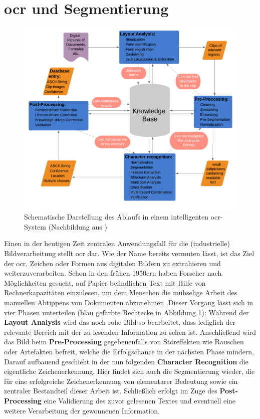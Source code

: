 	\section{\gls{ocr} und Segmentierung}
	\label{sec:ocr-seg}
		\begin{figure}[H]
			\centering
			\includegraphics[width=\linewidth]{Ablauf-OCR_Cheriet-et-al.pdf}
			\caption[typisches \gls{ocr}-Ablaufschema]{Schematische Darstellung des 
				Ablaufs in einem intelligenten \gls{ocr}-System (Nachbildung aus 
				\cite[Seite 7]{cher-et-al-ocr})}
			\label{fig:ocr-system}
		\end{figure}
		
		Einen in der heutigen Zeit zentralen Anwendungsfall für die (industrielle) Bildverarbeitung stellt \gls{ocr} dar. Wie der Name bereits vermuten lässt, ist das Ziel der \gls{ocr}, Zeichen oder Formen aus digitalen Bildern zu extrahieren und weiterzuverarbeiten. Schon in den frühen 1950ern haben Forscher nach Möglichkeiten gesucht, auf Papier befindlichen Text mit Hilfe von Rechnerkapazitäten einzulesen, um dem Menschen die mühselige Arbeit des manuellen Abtippens von Dokumenten abzunehmen \cite{cher-et-al-ocr}.Dieser Vorgang lässt sich in vier Phasen unterteilen (blau gefärbte Rechtecke in Abbildung \ref{fig:ocr-system}): Während der \textbf{Layout Analysis} wird das noch rohe Bild so bearbeitet, dass lediglich der relevante Bereich mit der zu lesenden Information zu sehen ist. Anschließend wird das Bild beim \textbf{Pre-Processing} gegebenenfalls von Störeffekten wie Rauschen oder Artefakten befreit, welche die Erfolgschance in der nächsten Phase mindern. Darauf aufbauend geschieht in der nun folgenden \textbf{Character Recognition} die eigentliche Zeichenerkennung. Hier findet sich auch die Segmentierung wieder, die für eine erfolgreiche Zeichenerkennung von elementarer Bedeutung sowie ein zentraler Bestandteil dieser Arbeit ist. Schließlich erfolgt im Zuge des \textbf{Post-Processing} eine Validierung des zuvor gelesenen Textes und eventuell eine weitere Verarbeitung der gewonnenen Information. \\
		
